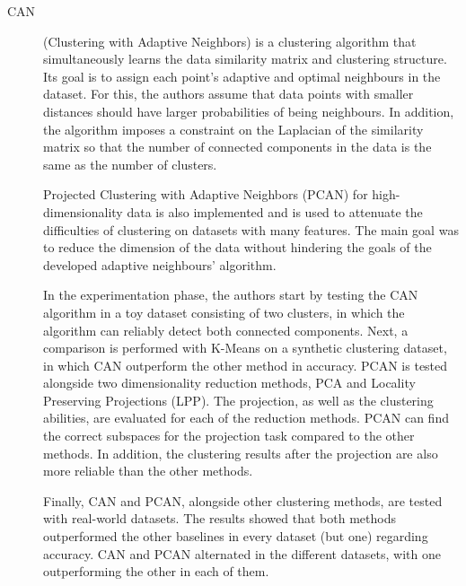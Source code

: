 \begin{description}
    \item[CAN]\cite{Nie.Wang.ea_Clusteringprojectedclustering_2014a} (Clustering with Adaptive Neighbors) is a clustering algorithm that simultaneously learns the data similarity matrix and clustering structure. Its goal is to assign each point's adaptive and optimal neighbours in the dataset. For this, the authors assume that data points with smaller distances should have larger probabilities of being neighbours. In addition, the algorithm imposes a constraint on the Laplacian of the similarity matrix so that the number of connected components in the data is the same as the number of clusters.
    
    Projected Clustering with Adaptive Neighbors (PCAN) for high-dimensionality data is also implemented and is used to attenuate the difficulties of clustering on datasets with many features. The main goal was to reduce the dimension of the data without hindering the goals of the developed adaptive neighbours' algorithm.

    In the experimentation phase, the authors start by testing the CAN algorithm in a toy dataset consisting of two clusters, in which the algorithm can reliably detect both connected components. Next, a comparison is performed with K-Means on a synthetic clustering dataset, in which CAN outperform the other method in accuracy. PCAN is tested alongside two dimensionality reduction methods, PCA and Locality Preserving Projections (LPP). The projection, as well as the clustering abilities, are evaluated for each of the reduction methods. PCAN can find the correct subspaces for the projection task compared to the other methods. In addition, the clustering results after the projection are also more reliable than the other methods. 

    Finally, CAN and PCAN, alongside other clustering methods, are tested with real-world datasets. The results showed that both methods outperformed the other baselines in every dataset (but one) regarding accuracy. CAN and PCAN alternated in the different datasets, with one outperforming the other in each of them.
\end{description}

